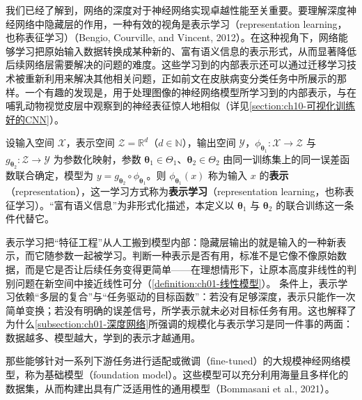 \documentclass[../../main.tex]{subfiles}
\begin{document}
我们已经了解到，网络的深度对于神经网络实现卓越性能至关重要。要理解深度神经网络中隐藏层的作用，一种有效的视角是表示学习（representation learning，也称表征学习）（Bengio, Courville, and Vincent, 2012）。在这种视角下，网络能够学习把原始输入数据转换成某种新的、富有语义信息的表示形式，从而显著降低后续网络层需要解决的问题的难度。这些学习到的内部表示还可以通过迁移学习技术被重新利用来解决其他相关问题，正如前文在皮肤病变分类任务中所展示的那样。一个有趣的发现是，用于处理图像的神经网络模型所学习到的内部表示，与在哺乳动物视觉皮层中观察到的神经表征惊人地相似（详见\cref{section:ch10-可视化训练好的CNN}）。

\begin{definition}[表示学习]\label{definition:ch01-表示学习}
设输入空间 $\mathcal{X}$，表示空间 $\mathcal{Z}=\mathbb{R}^{d}$（$d\in\mathbb{N}$），输出空间 $\mathcal{Y}$，$\phi_{\boldsymbol{\theta}_{1}}:\mathcal{X}\to\mathcal{Z}$ 与 $g_{\boldsymbol{\theta}_{2}}:\mathcal{Z}\to\mathcal{Y}$ 为参数化映射，参数 $\boldsymbol{\theta}_{1}\in\Theta_{1}$、$\boldsymbol{\theta}_{2}\in\Theta_{2}$ 由同一训练集上的同一误差函数联合确定，模型为 $y=g_{\boldsymbol{\theta}_{2}}\circ\phi_{\boldsymbol{\theta}_{1}}$。则 $\phi_{\boldsymbol{\theta}_{1}}(x)$ 称为输入 $x$ 的\textbf{表示}（representation），这一学习方式称为\textbf{表示学习}（representation learning，也称表征学习）。“富有语义信息”为非形式化描述，本定义以 $\boldsymbol{\theta}_{1}$ 与 $\boldsymbol{\theta}_{2}$ 的联合训练这一条件代替它。
\end{definition}

\begin{remark}
表示学习把“特征工程”从人工搬到模型内部：隐藏层输出的就是输入的一种新表示，而它随参数一起被学习。判断一种表示是否有用，标准不是它像不像原始数据，而是它是否让后续任务变得更简单——在理想情形下，让原本高度非线性的判别问题在新空间中接近线性可分（\cref{definition:ch01-线性模型}）。
条件上，表示学习依赖“多层的复合”与“任务驱动的目标函数”：若没有足够深度，表示只能作一次简单变换；若没有明确的误差信号，所学表示就未必对目标任务有用。这也解释了为什么\cref{subsection:ch01-深度网络}所强调的规模化与表示学习是同一件事的两面：数据越多、模型越大，学到的表示才越通用。
\end{remark}

那些能够针对一系列下游任务进行适配或微调（fine-tuned）的大规模神经网络模型，称为基础模型（foundation model）。这些模型可以充分利用海量且多样化的数据集，从而构建出具有广泛适用性的通用模型（Bommasani et al., 2021）。
\end{document}
